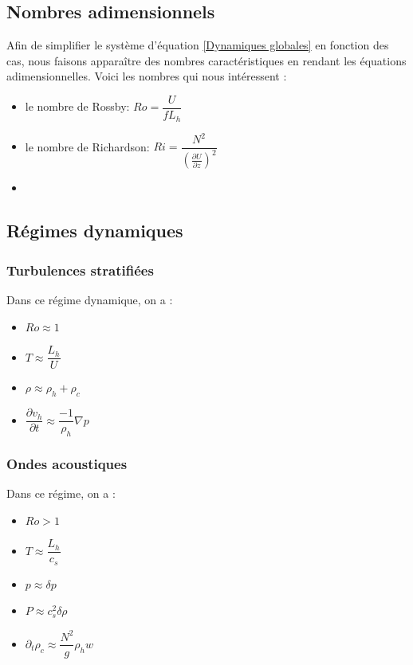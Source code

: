 \documentclass{rapportECC}
\begin{document}
\begin{appendices}
\newpage 

\subsection{Nombres adimensionnels}
Afin de simplifier le système d'équation \ref{Dynamiques globales} en fonction des cas, nous faisons apparaître des nombres caractéristiques en rendant les équations adimensionnelles. Voici les nombres qui nous intéressent :
\begin{itemize}
    \item le nombre de Rossby: $Ro = \dfrac{U}{fL_h}$
    \item le nombre de Richardson: $Ri = \dfrac{N^2}{(\frac{\partial U}{\partial z})^2}$
    \item 
\end{itemize}

\subsection{Régimes dynamiques}
\subsubsection{Turbulences stratifiées}
\label{turbu strat}
Dans ce régime dynamique, on a : 
\begin{itemize}
    \item $Ro \approx 1$
    \item $T \approx \dfrac{L_h}{U}$
    \item $\rho \approx \rho_h + \rho_c$
    \item $\dfrac{\partial v_h}{\partial t} \approx \dfrac{-1}{\rho_h}\nabla p$
\end{itemize}

\subsubsection{Ondes acoustiques}
\label{ondes acous}
Dans ce régime, on a :
\begin{itemize}
    \item $Ro > 1$
    \item $T \approx \dfrac{L_h}{c_s}$
    \item $p \approx \delta p$
    \item $P \approx c_s^2 \delta \rho$
    \item $\partial_t \rho_c \approx \dfrac{N^2}{g}\rho_h w$
\end{itemize}


\end{appendices}
\end{document}

